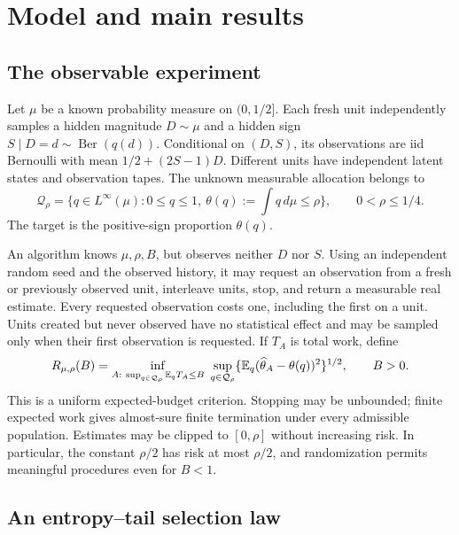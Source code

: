 \section{Model and main results}\label{sec:overview}

\subsection{The observable experiment}

Let $\mu$ be a known probability measure on $(0,1/2]$.
Each fresh unit independently samples a hidden magnitude $D\sim\mu$
and a hidden sign $S\mid D=d\sim\operatorname{Ber}(q(d))$.
Conditional on $(D,S)$, its observations are iid Bernoulli with mean
$1/2+(2S-1)D$. Different units have independent latent states and
observation tapes. The unknown measurable allocation belongs to
\[
 \mathcal Q_\rho=
 \{q\in L^\infty(\mu):0\le q\le1,\ \theta(q):=\textstyle\int q\,d\mu\le\rho\},
 \qquad 0<\rho\le1/4.
\]
The target is the positive-sign proportion $\theta(q)$.

An algorithm knows $\mu,\rho,B$, but observes neither $D$ nor $S$.
Using an independent random seed and the observed history, it may request
an observation from a fresh or previously observed unit, interleave
units, stop, and return a measurable real estimate. Every requested
observation costs one, including the first on a unit. Units created but
never observed have no statistical effect and may be sampled only when
their first observation is requested. If $T_A$ is total work, define
\begin{equation}\label{eq:model-risk}
 R_{\mu,\rho}(B)=
 \inf_{\substack{A:\ \sup_{q\in\mathcal Q_\rho}\mathbb E_qT_A\le B}}
 \ \sup_{q\in\mathcal Q_\rho}
       \{\mathbb E_q(\widehat\theta_A-\theta(q))^2\}^{1/2},
 \qquad B>0.
\end{equation}
This is a uniform expected-budget criterion. Stopping may be unbounded;
finite expected work gives almost-sure finite termination under every
admissible population. Estimates may be clipped to $[0,\rho]$ without
increasing risk. In particular, the constant $\rho/2$ has risk at most
$\rho/2$, and randomization permits meaningful procedures even for $B<1$.

\subsection{An entropy--tail selection law}

